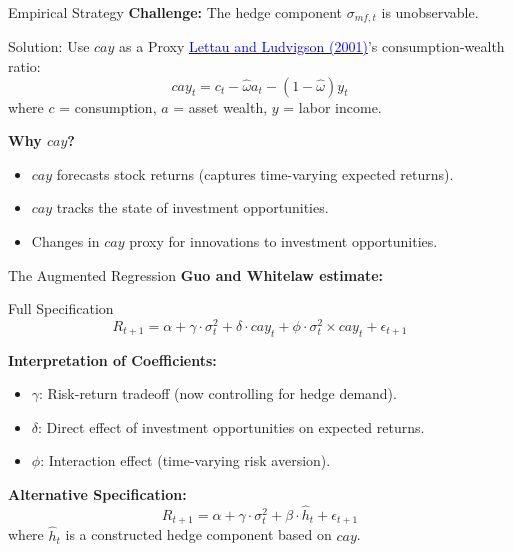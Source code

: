 \documentclass{beamer}
\begin{document}
\begin{frame}{Empirical Strategy}
    \textbf{Challenge:} The hedge component $\sigma_{mf,t}$ is unobservable.
    
    \begin{block}{Solution: Use $cay$ as a Proxy}
        \href{https://doi.org/10.1111/0022-1082.00347}{\textcolor{blue}{Lettau and Ludvigson (2001)}}'s consumption-wealth ratio:
        \begin{equation}
            cay_t = c_t - \hat{\omega} a_t - (1-\hat{\omega}) y_t
        \end{equation}
        where $c$ = consumption, $a$ = asset wealth, $y$ = labor income.
    \end{block}
    
    \textbf{Why $cay$?}
    \begin{itemize}
        \item $cay$ forecasts stock returns (captures time-varying expected returns).
        \item $cay$ tracks the state of investment opportunities.
        \item Changes in $cay$ proxy for innovations to investment opportunities.
    \end{itemize}
\end{frame}

\begin{frame}{The Augmented Regression}
    \textbf{Guo and Whitelaw estimate:}
    
    \begin{block}{Full Specification}
        \begin{equation}
            R_{t+1} = \alpha + \gamma \cdot \sigma_t^2 + \delta \cdot cay_t + \phi \cdot \sigma_t^2 \times cay_t + \epsilon_{t+1}
        \end{equation}
    \end{block}
    
    \textbf{Interpretation of Coefficients:}
    \begin{itemize}
        \item $\gamma$: Risk-return tradeoff (now controlling for hedge demand).
        \item $\delta$: Direct effect of investment opportunities on expected returns.
        \item $\phi$: Interaction effect (time-varying risk aversion).
    \end{itemize}
    
    \vspace{0.3cm}
    \textbf{Alternative Specification:}
    \begin{equation}
        R_{t+1} = \alpha + \gamma \cdot \sigma_t^2 + \beta \cdot \widehat{h}_t + \epsilon_{t+1}
    \end{equation}
    where $\widehat{h}_t$ is a constructed hedge component based on $cay$.
\end{frame}
\end{document}
